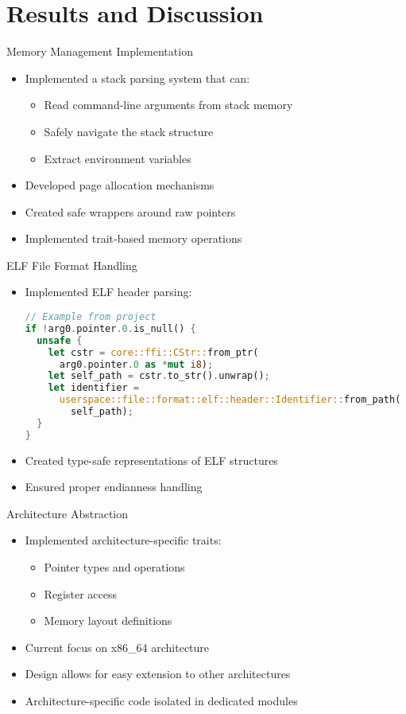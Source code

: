 \documentclass{beamer}
\begin{document}
\section{Results and Discussion}

\begin{frame}{Memory Management Implementation}
  \begin{itemize}
    \item Implemented a stack parsing system that can:
      \begin{itemize}
        \item Read command-line arguments from stack memory
        \item Safely navigate the stack structure
        \item Extract environment variables
      \end{itemize}
    \item Developed page allocation mechanisms
    \item Created safe wrappers around raw pointers
    \item Implemented trait-based memory operations
  \end{itemize}
\end{frame}

\begin{frame}[fragile]{ELF File Format Handling}
  \begin{itemize}
    \item Implemented ELF header parsing:
      \begin{lstlisting}[language=Rust]
// Example from project
if !arg0.pointer.0.is_null() {
  unsafe {
    let cstr = core::ffi::CStr::from_ptr(
      arg0.pointer.0 as *mut i8);
    let self_path = cstr.to_str().unwrap();
    let identifier =
      userspace::file::format::elf::header::Identifier::from_path(
        self_path);
  }
}
      \end{lstlisting}
    \item Created type-safe representations of ELF structures
    \item Ensured proper endianness handling
  \end{itemize}
\end{frame}

\begin{frame}{Architecture Abstraction}
  \begin{itemize}
    \item Implemented architecture-specific traits:
      \begin{itemize}
        \item Pointer types and operations
        \item Register access
        \item Memory layout definitions
      \end{itemize}
    \item Current focus on x86\_64 architecture
    \item Design allows for easy extension to other architectures
    \item Architecture-specific code isolated in dedicated modules
  \end{itemize}
\end{frame}
\end{document}
